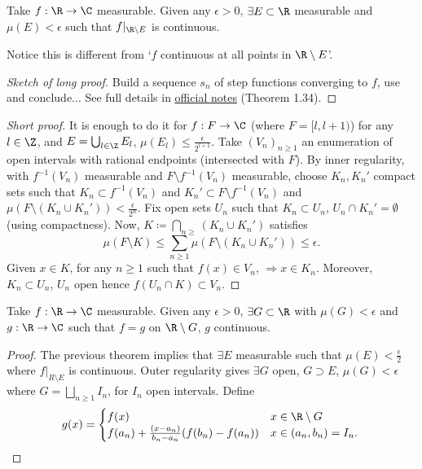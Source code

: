 \documentclass[twoside]{article}
\begin{document}
\begin{thm}
    Take $f: \R \to \C$ measurable. Given any $\epsilon > 0$, $\exists E \subset \R$ measurable and $\mu(E) < \epsilon$ such that $f|_{\R \setminus E}$ is continuous.
\end{thm}
\begin{remark}
    Notice this is different from `$f$ continuous at all points in $\R \setminus E$'.
\end{remark}
\begin{proof}[Sketch of long proof]
    Build a sequence $s_n$ of step functions converging to $f$, use  and conclude... See full details in \href{https://cmouhot.files.wordpress.com/2017/01/notes-af-v21.pdf}{official notes} (Theorem 1.34).
\end{proof}
\begin{proof}[Short proof]
    It is enough to do it for $f: F \to \C$ (where $F = [l, l+1)$) for any $l \in \Z$, and $E = \bigcup_{l \in \Z} E_l$, $\mu(E_l) \leq \frac{\epsilon}{2^{l+1}}$.
    Take $(V_n)_{n \geq 1}$ an enumeration of open intervals with rational endpoints (intersected with $F$).
    By inner regularity, with $f^{-1}(V_n)$ measurable and $F \setminus f^{-1}(V_n)$ measurable, choose $K_n, K_n'$ compact sets such that $K_n \subset f^{-1}(V_n)$ and $K_n' \subset F\setminus f^{-1}(V_n)$ and $\mu(F \setminus (K_n \cup K_n')) < \frac{\epsilon}{2^n}$.
    Fix open sets $U_n$ such that $K_n \subset U_n$, $U_n \cap K_n' = \emptyset$ (using compactness).
    Now, $K \coloneqq \bigcap_{n \geq } (K_n \cup K_n')$ satisfies
    \begin{equation*}
        \mu(F \setminus K) \leq \sum_{n \geq 1} \mu(F \setminus (K_n \cup K_n')) \leq \epsilon.
    \end{equation*}
    Given $x \in K$, for any $n \geq 1$ such that $f(x) \in V_n$, $\Rightarrow x \in K_n$. Moreover, $K_n \subset U_n$, $U_n$ open hence $f(U_n \cap K) \subset V_n$.
\end{proof}
\begin{thm}
    Take $f: \R \to \C$ measurable. Given any $\epsilon > 0$, $\exists G \subset \R$ with $\mu(G) < \epsilon$ and $g: \R \to \C$ such that $f = g$ on $\R \setminus G$, $g$ continuous.
\end{thm}
\begin{proof}
    The previous theorem implies that $\exists E$ measurable such that $\mu(E) < \frac{\epsilon}{2}$ where $f|_{R \setminus E}$ is continuous.
    Outer regularity gives $\exists G$ open, $G \supset E$, $\mu(G) < \epsilon$ where $G = \bigsqcup_{n \geq 1} I_n$, for $I_n$ open intervals.
    Define
    \begin{equation*}
        g(x) =
        \begin{cases}
            f(x) & x \in \R \setminus G \\
            f(a_n) + \frac{(x-a_n)}{b_n - a_n} (f(b_n) - f(a_n)) & x \in (a_n, b_n)=I_n.
        \end{cases}\qedhere
    \end{equation*}
\end{proof}
\end{document}
